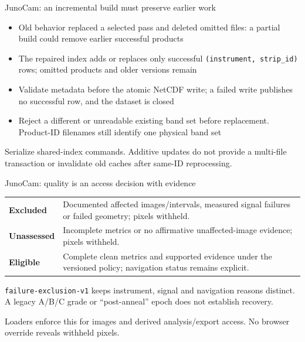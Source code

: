 \documentclass[aspectratio=169,11pt]{beamer}
\newcommand{\currevsec}{}
\newcommand{\revsec}[1]{\gdef\currevsec{#1}}
\begin{document}
\begin{frame}{JunoCam: an incremental build must preserve earlier work}
  \revsec{4.18}
  \begin{itemize}
    \item Old behavior replaced a selected pass and deleted omitted files: a partial build could remove earlier successful products
    \item The repaired index adds or replaces only successful \texttt{(instrument, strip\_id)} rows; omitted products and older versions remain
    \item Validate metadata before the atomic NetCDF write; a failed write publishes no successful row, and the dataset is closed
    \item Reject a different or unreadable existing band set before replacement. Product-ID filenames still identify one physical band set
  \end{itemize}
  \vspace{0.2cm}
  Serialize shared-index commands. Additive updates do not provide a multi-file transaction or invalidate old caches after same-ID reprocessing.
\end{frame}

\begin{frame}{JunoCam: quality is an access decision with evidence}
  \revsec{4.18}
\small
  \begin{tabular}{lp{10cm}}
    \toprule
    \textbf{Excluded} & Documented affected images/intervals, measured signal failures or failed geometry; pixels withheld. \\
    \textbf{Unassessed} & Incomplete metrics or no affirmative unaffected-image evidence; pixels withheld. \\
    \textbf{Eligible} & Complete clean metrics and supported evidence under the versioned policy; navigation status remains explicit. \\
    \bottomrule
  \end{tabular}\par
  \vspace{0.3cm}
  \texttt{failure-exclusion-v1} keeps instrument, signal and navigation reasons distinct. A legacy A/B/C grade or ``post-anneal'' epoch does not establish recovery.
  \vspace{0.2cm}

  Loaders enforce this for images and derived analysis/export access. No browser override reveals withheld pixels.
\end{frame}
\end{document}

